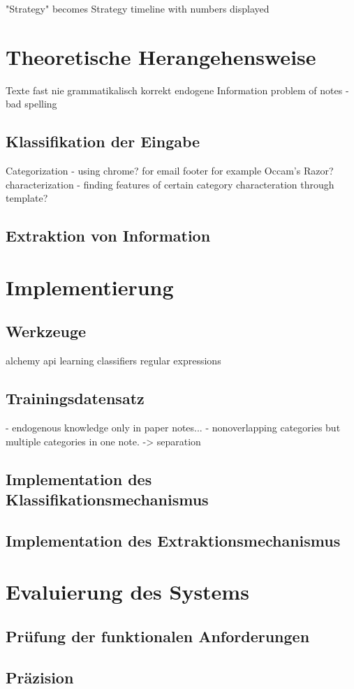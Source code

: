 "Strategy" becomes Strategy timeline with numbers displayed
\section{Theoretische Herangehensweise}
Texte fast nie grammatikalisch korrekt
endogene Information
problem of notes - bad spelling
\subsection{Klassifikation der Eingabe}
Categorization - using chrome? for email footer for example
Occam's Razor?
characterization - finding features of certain category
characteration through template?
\subsection{Extraktion von Information}

\section{Implementierung}
\subsection{Werkzeuge}
alchemy api
learning classifiers
regular expressions

\subsection{Trainingsdatensatz}
- endogenous knowledge only in paper notes...
- nonoverlapping categories but multiple categories in one note. -> separation
\subsection{Implementation des Klassifikationsmechanismus}
\subsection{Implementation des Extraktionsmechanismus}
\section{Evaluierung des Systems}
\subsection{Prüfung der funktionalen Anforderungen}
\subsection{Präzision}


